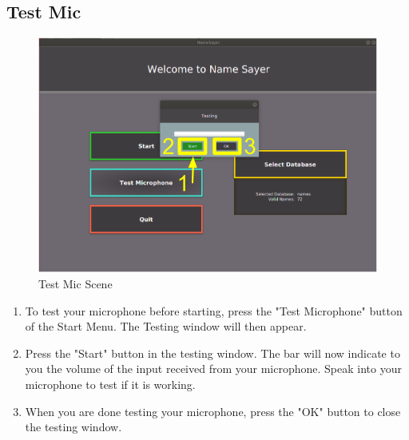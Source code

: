 \documentclass[a4paper,12pt]{article}
\begin{document}
\subsection{Test Mic}
\begin{figure}[!h]
	\includegraphics[width=\linewidth]{testmic.png}
	\caption{Test Mic Scene}
\end{figure}
\begin{enumerate}[label=\textbf{\arabic*}]
	\item To test your microphone before starting, press the "Test Microphone" button of the Start Menu. The Testing window will then appear.
	\\
	
	\item Press the "Start" button in the testing window. The bar will now indicate to you the volume of the input received from your microphone. Speak into your microphone to test if it is working.
	\\
	
	\item When you are done testing your microphone, press the "OK" button to close the testing window.
	\\
	
\end{enumerate}
\newpage
\end{document}
